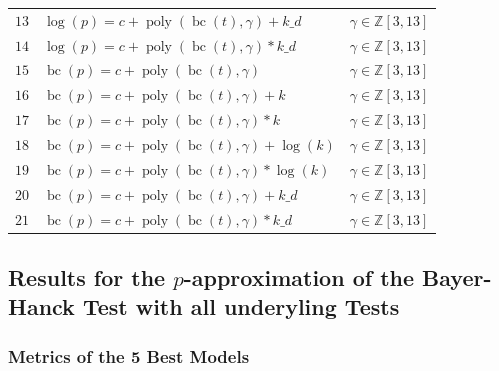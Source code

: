 \documentclass[12pt,a4paper]{article}
\DeclareMathOperator{\bc}{bc}
\DeclareMathOperator{\poly}{poly}
\begin{document}
\begin{table}
\begin{tabular}{rlc}
        $13$ & $\log(p) = c + \poly\left( \bc(t), \gamma \right) + k\_d $ & $\gamma \in \mathbb{Z} \left[3, 13 \right]$\\
        $14$ & $\log(p) = c + \poly\left( \bc(t), \gamma \right) * k\_d $ & $\gamma \in \mathbb{Z} \left[3, 13 \right]$\\   
        \midrule
        $15$ & $\bc(p) = c + \poly\left( \bc(t), \gamma \right) $ & $\gamma \in \mathbb{Z} \left[3, 13 \right]$\\ 
        $16$ & $\bc(p) = c + \poly\left( \bc(t), \gamma \right) + k $ & $\gamma \in \mathbb{Z} \left[3, 13 \right]$\\
        $17$ & $\bc(p) = c + \poly\left( \bc(t), \gamma \right) * k $ & $\gamma \in \mathbb{Z} \left[3, 13 \right]$\\
        $18$ & $\bc(p) = c + \poly\left( \bc(t), \gamma \right) + \log(k) $ & $\gamma \in \mathbb{Z} \left[3, 13 \right]$\\
        $19$ & $\bc(p) = c + \poly\left( \bc(t), \gamma \right) * \log(k) $ & $\gamma \in \mathbb{Z} \left[3, 13 \right]$\\
        $20$ & $\bc(p) = c + \poly\left( \bc(t), \gamma \right) + k\_d $ & $\gamma \in \mathbb{Z} \left[3, 13 \right]$\\
        $21$ & $\bc(p) = c + \poly\left( \bc(t), \gamma \right) * k\_d $ & $\gamma \in \mathbb{Z} \left[3, 13 \right]$\\    
        \bottomrule
    \end{tabular}
\end{table}
\FloatBarrier

\hypertarget{results-for-the-p-approximation-of-the-bayer-hanck-test-with-all-underyling-tests}{%
\subsection{\texorpdfstring{Results for the \(p\)-approximation of the
Bayer-Hanck Test with all underyling
Tests}{Results for the p-approximation of the Bayer-Hanck Test with all underyling Tests}}\label{results-for-the-p-approximation-of-the-bayer-hanck-test-with-all-underyling-tests}}

\hypertarget{metrics-of-the-5-best-models}{%
\subsubsection{Metrics of the 5 Best
Models}\label{metrics-of-the-5-best-models}}
\end{document}
